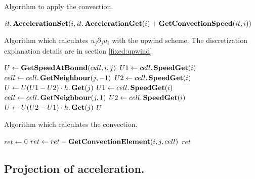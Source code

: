 \begin{algorithm}
\caption{Algorithm to apply the convection.}
\label{code:ApplyConvection}
\begin{algorithmic}[1]
					\State $it.\mathop{\textbf{AccelerationSet}}(i,it.\mathop{\textbf{AccelerationGet}}(i)+\mathop{\textbf{GetConvectionSpeed}}(it,i))$ 
				\EndIf
			\EndFor
		\EndFor
	\EndFunction
		\end{algorithmic}
\end{algorithm}

\begin{algorithm}
\caption{Algorithm which calculates $u_{j}\partial_{j}u_{i}$ with the upwind scheme. The discretization explanation details are in section \ref{fixed:upwind}}
\label{code:GetConvectionElement}
\begin{algorithmic}[1]
		\State $U \gets \mathop{\textbf{GetSpeedAtBound}}(cell,i,j)$
			\State $U1\gets cell.\mathop{\textbf{SpeedGet}}(i)$
			\State $cell \gets cell.\mathop{\textbf{GetNeighbour}}(j,-1)$
			\State $U2 \gets cell.\mathop{\textbf{SpeedGet}}(i)$
			\State $U \gets U(U1-U2)\cdot h.\mathop{\textbf{Get}}(j)$
		\Else
			\State $U1 \gets cell.\mathop{\textbf{SpeedGet}}(i)$
			\State $cell \gets cell.\mathop{\textbf{GetNeighbour}}(j,1)$
			\State $U2\gets cell.\mathop{\textbf{SpeedGet}}(i)$
			\State $U\gets U(U2-U1)\cdot h.\mathop{\textbf{Get}}(j)$
		\EndIf
		\State \Return $U$
\EndFunction
			\end{algorithmic}
\end{algorithm}

\begin{algorithm}
\caption{Algorithm which calculates the convection.}
\label{code:GetConvectionSpeed}
\begin{algorithmic}[1]
		\State  $ret \gets 0$
			\State $ret\gets ret-\mathop{\textbf{GetConvectionElement}}(i,j,cell)$
		\EndFor
		\State \Return $ret$
	\EndFunction
 \end{algorithmic}
\end{algorithm}


\subsection{Projection of acceleration.}

